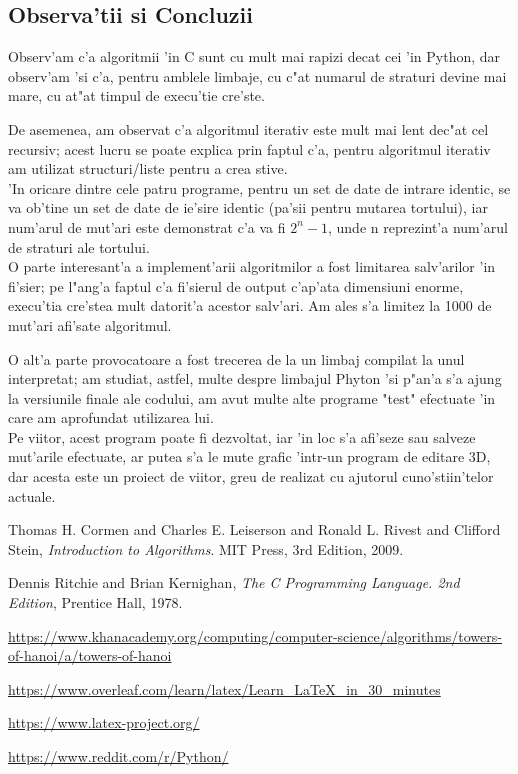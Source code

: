 \documentclass{article}
\begin{document}
\newpage
\subsection{Observa'tii si Concluzii}

Observ'am c'a algoritmii 'in C sunt cu mult mai rapizi decat cei 'in Python, dar observ'am 'si c'a, pentru amblele limbaje, cu c"at numarul de straturi devine mai mare, cu at"at timpul de execu'tie cre'ste.

De asemenea, am observat c'a algoritmul iterativ este mult mai lent dec"at cel recursiv; acest lucru se poate explica prin faptul c'a, pentru algoritmul iterativ am utilizat structuri/liste pentru a crea stive.\\

'In oricare dintre cele patru programe, pentru un set de date de intrare identic, se va ob'tine un set de date de ie'sire identic (pa'sii pentru mutarea tortului), iar num'arul de mut'ari este demonstrat c'a va fi $2^n-1$, unde n reprezint'a num'arul de straturi ale tortului.\\

O parte interesant'a a implement'arii algoritmilor a fost limitarea salv'arilor 'in fi'sier; pe l"ang'a faptul c'a fi'sierul de output c'ap'ata dimensiuni enorme, execu'tia cre'stea mult datorit'a acestor salv'ari. Am ales s'a limitez la 1000 de mut'ari afi'sate algoritmul.

O alt'a parte provocatoare a fost trecerea de la un limbaj compilat la unul interpretat; am studiat, astfel, multe despre limbajul Phyton 'si p"an'a s'a ajung la versiunile finale ale codului, am avut multe alte programe "test" efectuate 'in care am aprofundat utilizarea lui.\\

Pe viitor, acest program poate fi dezvoltat, iar 'in loc s'a afi'seze sau salveze mut'arile efectuate, ar putea s'a le mute grafic 'intr-un program de editare 3D, dar acesta este un proiect de viitor, greu de realizat cu ajutorul cuno'stiin'telor actuale.


\newpage

\begin{thebibliography}{9}

   
     Thomas H. Cormen and Charles E. Leiserson and Ronald L. Rivest and Clifford Stein,
     \emph{Introduction to Algorithms}.
     MIT Press,
     3rd Edition,
     2009.
     
     Dennis Ritchie and Brian Kernighan,
     \emph{The C Programming Language. 2nd Edition},
     Prentice Hall,
     1978.
     
     \url{https://www.khanacademy.org/computing/computer-science/algorithms/towers-of-hanoi/a/towers-of-hanoi}
     
     \url{https://www.overleaf.com/learn/latex/Learn_LaTeX_in_30_minutes}
     
     \url{https://www.latex-project.org/}
     
     \url{https://www.reddit.com/r/Python/}






\end{thebibliography}
\end{document}
